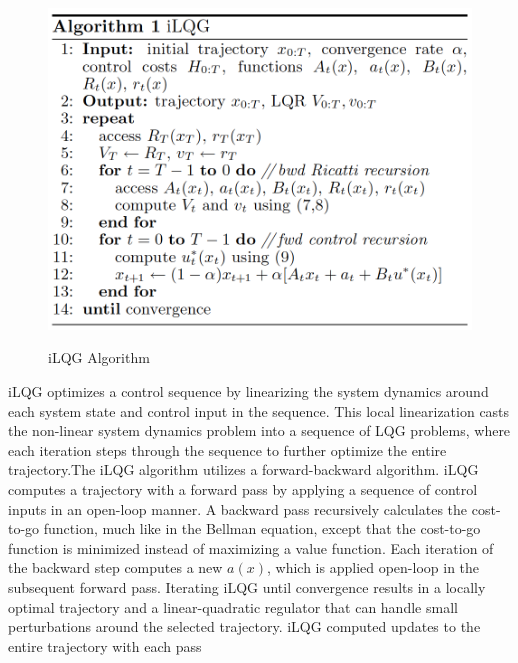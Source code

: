 \documentclass[12pt]{article}
\begin{document}
            \begin{figure}
                \centering
                \includegraphics[width=0.45\linewidth]{images/algorithms/ilqg.png}
                \label{fig:ilqg}
                \caption{iLQG Algorithm \protect\cite{todorov_generalized_2005}}
            \end{figure}

            \par iLQG optimizes a control sequence by linearizing the system dynamics around each system state and control input in the sequence. This local linearization casts the non-linear system dynamics problem into a sequence of LQG problems, where each iteration steps through the sequence to further optimize the entire trajectory.The iLQG algorithm utilizes a forward-backward algorithm. iLQG computes a trajectory with a forward pass by applying a sequence of control inputs in an open-loop manner. A backward pass recursively calculates the cost-to-go function, much like in the Bellman equation, except that the cost-to-go function is minimized instead of maximizing a value function. Each iteration of the backward step computes a new $a(x)$, which is applied open-loop in the subsequent forward pass. Iterating iLQG until convergence results in a locally optimal trajectory and a linear-quadratic regulator that can handle small perturbations around the selected trajectory.\cite{todorov_generalized_2005} iLQG computed updates to the entire trajectory with each pass
\end{document}
